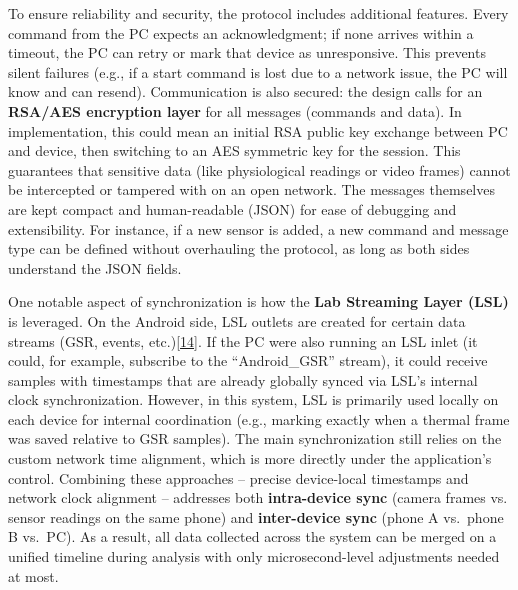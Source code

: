 \documentclass[12pt,a4paper]{article}
\begin{document}
To ensure reliability and security, the protocol includes additional features. Every command from the PC expects an acknowledgment; if none arrives within a timeout, the PC can retry or mark that device as unresponsive. This prevents silent failures (e.g., if a start command is lost due to a network issue, the PC will know and can resend). Communication is also secured: the design calls for an \textbf{RSA/AES encryption layer} for all messages (commands and data). In implementation, this could mean an initial RSA public key exchange between PC and device, then switching to an AES symmetric key for the session. This guarantees that sensitive data (like physiological readings or video frames) cannot be intercepted or tampered with on an open network. The messages themselves are kept compact and human-readable (JSON) for ease of debugging and extensibility. For instance, if a new sensor is added, a new command and message type can be defined without overhauling the protocol, as long as both sides understand the JSON fields.

One notable aspect of synchronization is how the \textbf{Lab Streaming Layer (LSL)} is leveraged. On the Android side, LSL outlets are created for certain data streams (GSR, events, etc.)\href{https://github.com/buccancs/GSR-Dual-Video-System/blob/05ae360cb7b4ae7c7861f72deb235ad64a74b38e/android/app/src/main/java/com/yourcompany/gsrcapture/controller/RecordingController.kt\#L39-L47}{{[}14{]}}. If the PC were also running an LSL inlet (it could, for example, subscribe to the ``Android\_GSR'' stream), it could receive samples with timestamps that are already globally synced via LSL's internal clock synchronization. However, in this system, LSL is primarily used locally on each device for internal coordination (e.g., marking exactly when a thermal frame was saved relative to GSR samples). The main synchronization still relies on the custom network time alignment, which is more directly under the application's control. Combining these approaches -- precise device-local timestamps and network clock alignment -- addresses both \textbf{intra-device sync} (camera frames vs. sensor readings on the same phone) and \textbf{inter-device sync} (phone A vs.~phone B vs.~PC). As a result, all data collected across the system can be merged on a unified timeline during analysis with only microsecond-level adjustments needed at most.
\end{document}
